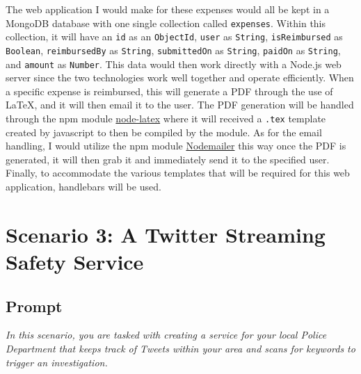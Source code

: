 \documentclass[11pt]{article}
\begin{document}
	The web application I would make for these expenses would all be kept in a MongoDB database with one single collection called \texttt{expenses}. Within this collection, it will have an \texttt{id} as an \texttt{ObjectId}, \texttt{user} as \texttt{String}, \texttt{isReimbursed} as \texttt{Boolean}, \texttt{reimbursedBy} as \texttt{String}, \texttt{submittedOn} as \texttt{String}, \texttt{paidOn} as \texttt{String}, and \texttt{amount} as \texttt{Number}. This data would then work directly with a Node.js web server since the two technologies work well together and operate efficiently. When a specific expense is reimbursed, this will generate a PDF through the use of \LaTeX, and it will then email it to the user. The PDF generation will be handled through the npm module \href{https://www.npmjs.com/package/node-latex}{node-latex} where it will received a \texttt{.tex} template created by javascript to then be compiled by the module. As for the email handling, I would utilize the npm module \href{https://www.npmjs.com/package/nodemailer}{Nodemailer} this way once the PDF is generated, it will then grab it and immediately send it to the specified user. Finally, to accommodate the various templates that will be required for this web application, handlebars will be used.

	\section*{Scenario 3: A Twitter Streaming Safety Service}
	\subsection*{Prompt}
	\textit{In this scenario, you are tasked with creating a service for your local Police Department that keeps track of Tweets within your area and scans for keywords to trigger an investigation.}
\end{document}
